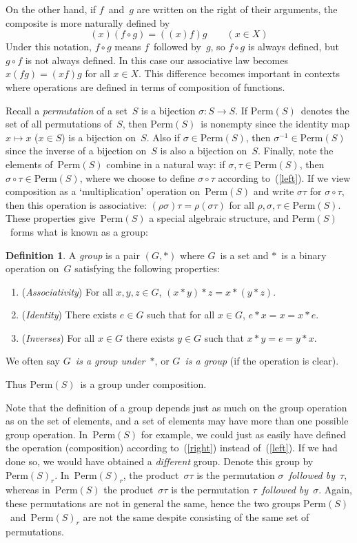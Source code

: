 \documentclass[letterpaper]{article}
\theoremstyle{definition}
\newtheorem*{defn}{Definition}
\theoremstyle{plain}
\newcommand{\perm}[1]{\mathrm{Perm}({#1})}
\begin{document}
On the other hand, if $f$~and~$g$ are written on the right of their arguments, the composite is more naturally defined by
\begin{equation}
(x)(f\circ g)=((x)f)g\qquad(x\in X)\label{right}
\end{equation}
Under this notation, $f\circ g$ means $f$~followed by~$g$, so $f\circ g$ is always defined, but $g\circ f$ is not always defined. In this case our associative law becomes $x(fg)=(xf)g$ for all $x\in X$. This difference becomes important in contexts where operations are defined in terms of composition of functions.

Recall a \emph{permutation} of a set~$S$ is a bijection $\sigma:S\to S$. If $\perm{S}$~denotes the set of all permutations of~$S$, then $\perm{S}$~is nonempty since the identity map $x\mapsto x$ ($x\in S$) is a bijection on~$S$. Also if $\sigma\in\perm{S}$, then $\sigma^{-1}\in\perm{S}$ since the inverse of a bijection on~$S$ is also a bijection on~$S$. Finally, note the elements of~$\perm{S}$ combine in a natural way: if $\sigma,\tau\in\perm{S}$, then $\sigma\circ\tau\in\perm{S}$, where we choose to define $\sigma\circ\tau$ according to~(\ref{left}). If we view composition as a `multiplication' operation on~$\perm{S}$ and write $\sigma\tau$ for $\sigma\circ\tau$, then this operation is associative: $(\rho\sigma)\tau=\rho(\sigma\tau)$ for all $\rho,\sigma,\tau\in\perm{S}$. These properties give~$\perm{S}$ a special algebraic structure, and $\perm{S}$~forms what is known as a group:
\goodbreak
\begin{defn}
A \emph{group} is a pair $(G,*)$ where $G$~is a set and $*$~is a binary operation on~$G$ satisfying the following properties:
\begin{enumerate}[itemsep=0pt]
\item (\emph{Associativity}) For all $x,y,z\in G$, $(x*y)*z=x*(y*z)$.
\item (\emph{Identity}) There exists $e\in G$ such that for all $x\in G$, $e*x=x=x*e$.
\item (\emph{Inverses}) For all $x\in G$ there exists $y\in G$ such that $x*y=e=y*x$.
\end{enumerate}
We often say \emph{$G$~is a group under~$*$}, or \emph{$G$~is a group} (if the operation is clear).
\end{defn}
\noindent Thus $\perm{S}$~is a group under composition.

Note that the definition of a group depends just as much on the group operation as on the set of elements, and a set of elements may have more than one possible group operation. In~$\perm{S}$ for example, we could just as easily have defined the operation (composition) according to~(\ref{right}) instead of~(\ref{left}). If we had done so, we would have obtained a \emph{different} group. Denote this group by~$\perm{S}_r$. In~$\perm{S}_r$, the product~$\sigma\tau$ is the permutation \emph{$\sigma$~followed by~$\tau$}, whereas in~$\perm{S}$ the product~$\sigma\tau$ is the permutation \emph{$\tau$~followed by~$\sigma$}. Again, these permutations are not in general the same, hence the two groups $\perm{S}$~and~$\perm{S}_r$ are not the same despite consisting of the same set of permutations.
\end{document}
